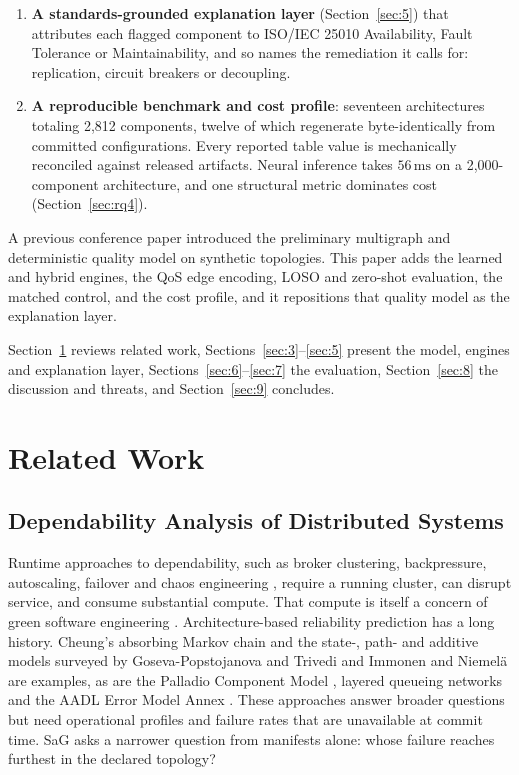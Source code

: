 \documentclass[preprint,3p]{elsarticle}
\begin{document}
\begin{enumerate}
    \item \textbf{A standards-grounded explanation layer} (Section~\ref{sec:5}) that attributes each flagged component to ISO/IEC 25010 Availability, Fault Tolerance or Maintainability, and so names the remediation it calls for: replication, circuit breakers or decoupling.
    \item \textbf{A reproducible benchmark and cost profile}: seventeen architectures totaling 2,812 components, twelve of which regenerate byte-identically from committed configurations. Every reported table value is mechanically reconciled against released artifacts. Neural inference takes $56\,\text{ms}$ on a 2,000-component architecture, and one structural metric dominates cost (Section~\ref{sec:rq4}).
\end{enumerate}

\noindent A previous conference paper \cite{yigit2025graph} introduced the preliminary multigraph and deterministic quality model on synthetic topologies. This paper adds the learned and hybrid engines, the QoS edge encoding, LOSO and zero-shot evaluation, the matched control, and the cost profile, and it repositions that quality model as the explanation layer.

Section~\ref{sec:2} reviews related work, Sections~\ref{sec:3}--\ref{sec:5} present the model, engines and explanation layer, Sections~\ref{sec:6}--\ref{sec:7} the evaluation, Section~\ref{sec:8} the discussion and threats, and Section~\ref{sec:9} concludes.

\section{Related Work}
\label{sec:2}

\subsection{Dependability Analysis of Distributed Systems}
\label{sec:2.1}

Runtime approaches to dependability, such as broker clustering, backpressure, autoscaling, failover and chaos engineering \cite{basiri2016chaos}, require a running cluster, can disrupt service, and consume substantial compute. That compute is itself a concern of green software engineering \cite{calero2015green,lannelongue2021green,verdecchia2023greenai}. Architecture-based reliability prediction has a long history. Cheung's absorbing Markov chain \cite{cheung1980user} and the state-, path- and additive models surveyed by Goseva-Popstojanova and Trivedi \cite{gosevapopstojanova2001architecture} and Immonen and Niemel{\"a} \cite{immonen2008survey} are examples, as are the Palladio Component Model \cite{becker2009palladio}, layered queueing networks \cite{franks2009layered} and the AADL Error Model Annex \cite{delange2014aadl}. These approaches answer broader questions but need operational profiles and failure rates that are unavailable at commit time. SaG asks a narrower question from manifests alone: whose failure reaches furthest in the declared topology?
\end{document}
